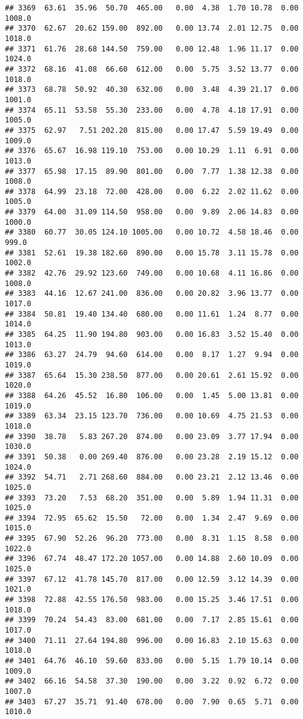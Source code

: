 \documentclass{article}\usepackage{graphicx, color}
\makeatletter
\newenvironment{kframe}{%
 \def\at@end@of@kframe{}%
 \ifinner\ifhmode%
  \def\at@end@of@kframe{\end{minipage}}%
  \begin{minipage}{\columnwidth}%
 \fi\fi%
 \def\FrameCommand##1{\hskip\@totalleftmargin \hskip-\fboxsep
 \colorbox{shadecolor}{##1}\hskip-\fboxsep
     \hskip-\linewidth \hskip-\@totalleftmargin \hskip\columnwidth}%
 \MakeFramed {\advance\hsize-\width
   \@totalleftmargin\z@ \linewidth\hsize
   \@setminipage}}%
 {\par\unskip\endMakeFramed%
 \at@end@of@kframe}
\newenvironment{knitrout}{}{} %
\makeatother
\begin{document}
\begin{knitrout}
\begin{kframe}
\begin{verbatim}
## 3369  63.61  35.96  50.70  465.00   0.00  4.38  1.70 10.78  0.00 1008.0
## 3370  62.67  20.62 159.00  892.00   0.00 13.74  2.01 12.75  0.00 1018.0
## 3371  61.76  28.68 144.50  759.00   0.00 12.48  1.96 11.17  0.00 1024.0
## 3372  68.16  41.08  66.60  612.00   0.00  5.75  3.52 13.77  0.00 1018.0
## 3373  68.78  50.92  40.30  632.00   0.00  3.48  4.39 21.17  0.00 1001.0
## 3374  65.11  53.58  55.30  233.00   0.00  4.78  4.18 17.91  0.00 1005.0
## 3375  62.97   7.51 202.20  815.00   0.00 17.47  5.59 19.49  0.00 1009.0
## 3376  65.67  16.98 119.10  753.00   0.00 10.29  1.11  6.91  0.00 1013.0
## 3377  65.98  17.15  89.90  801.00   0.00  7.77  1.38 12.38  0.00 1008.0
## 3378  64.99  23.18  72.00  428.00   0.00  6.22  2.02 11.62  0.00 1005.0
## 3379  64.00  31.09 114.50  958.00   0.00  9.89  2.06 14.83  0.00 1000.0
## 3380  60.77  30.05 124.10 1005.00   0.00 10.72  4.58 18.46  0.00  999.0
## 3381  52.61  19.38 182.60  890.00   0.00 15.78  3.11 15.78  0.00 1002.0
## 3382  42.76  29.92 123.60  749.00   0.00 10.68  4.11 16.86  0.00 1008.0
## 3383  44.16  12.67 241.00  836.00   0.00 20.82  3.96 13.77  0.00 1017.0
## 3384  50.81  19.40 134.40  680.00   0.00 11.61  1.24  8.77  0.00 1014.0
## 3385  64.25  11.90 194.80  903.00   0.00 16.83  3.52 15.40  0.00 1013.0
## 3386  63.27  24.79  94.60  614.00   0.00  8.17  1.27  9.94  0.00 1019.0
## 3387  65.64  15.30 238.50  877.00   0.00 20.61  2.61 15.92  0.00 1020.0
## 3388  64.26  45.52  16.80  106.00   0.00  1.45  5.00 13.81  0.00 1019.0
## 3389  63.34  23.15 123.70  736.00   0.00 10.69  4.75 21.53  0.00 1018.0
## 3390  38.78   5.83 267.20  874.00   0.00 23.09  3.77 17.94  0.00 1030.0
## 3391  50.38   0.00 269.40  876.00   0.00 23.28  2.19 15.12  0.00 1024.0
## 3392  54.71   2.71 268.60  884.00   0.00 23.21  2.12 13.46  0.00 1025.0
## 3393  73.20   7.53  68.20  351.00   0.00  5.89  1.94 11.31  0.00 1025.0
## 3394  72.95  65.62  15.50   72.00   0.00  1.34  2.47  9.69  0.00 1015.0
## 3395  67.90  52.26  96.20  773.00   0.00  8.31  1.15  8.58  0.00 1022.0
## 3396  67.74  48.47 172.20 1057.00   0.00 14.88  2.60 10.09  0.00 1025.0
## 3397  67.12  41.78 145.70  817.00   0.00 12.59  3.12 14.39  0.00 1021.0
## 3398  72.88  42.55 176.50  983.00   0.00 15.25  3.46 17.51  0.00 1018.0
## 3399  70.24  54.43  83.00  681.00   0.00  7.17  2.85 15.61  0.00 1017.0
## 3400  71.11  27.64 194.80  996.00   0.00 16.83  2.10 15.63  0.00 1018.0
## 3401  64.76  46.10  59.60  833.00   0.00  5.15  1.79 10.14  0.00 1009.0
## 3402  66.16  54.58  37.30  190.00   0.00  3.22  0.92  6.72  0.00 1007.0
## 3403  67.27  35.71  91.40  678.00   0.00  7.90  0.65  5.71  0.00 1010.0

\end{verbatim}
\end{kframe}
\end{knitrout}
\end{document}

